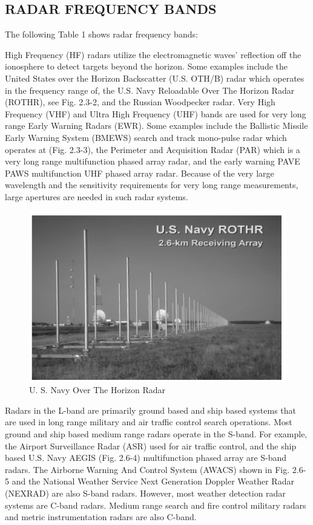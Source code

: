\documentclass[14pt]{article} %
\begin{document}
\subsection{RADAR FREQUENCY BANDS}
The following Table 1 shows radar frequency bands:

 

High Frequency (HF) radars utilize the electromagnetic waves’ reflection off the ionosphere to detect targets beyond the horizon. Some examples include the United States over the Horizon Backscatter (U.S. OTH/B) radar which operates in the frequency range of, the U.S. Navy Reloadable Over The Horizon Radar (ROTHR), see Fig. 2.3-2, and the Russian Woodpecker radar. Very High Frequency (VHF) and Ultra High Frequency (UHF) bands are used for very long range Early Warning Radars (EWR). Some examples include the Ballistic Missile Early Warning System (BMEWS) search and track mono-pulse radar which operates at (Fig. 2.3-3), the Perimeter and Acquisition Radar (PAR) which is a very long range multifunction phased
array radar, and the early warning PAVE PAWS multifunction UHF phased array radar. Because of the very large wavelength and the sensitivity requirements for very long range measurements, large apertures are needed in such radar systems.


 \begin{figure}[H]
  \includegraphics[width=\linewidth]{Horizonradar.png}
  \caption{U. S. Navy Over The Horizon Radar}
  \label{fig:figure 4}
\end{figure}
Radars in the L-band are primarily ground based and ship based systems that are used in long range military and air traffic control search operations. Most ground and ship based medium range radars operate in the S-band. For example, the Airport Surveillance Radar (ASR) used for air traffic control, and the ship based U.S. Navy AEGIS (Fig. 2.6-4) multifunction phased array are S-band radars. The Airborne Warning And Control System (AWACS) shown in Fig. 2.6-5 and the National Weather Service Next Generation Doppler Weather Radar (NEXRAD) are also S-band radars. However, most weather detection radar systems are C-band radars. Medium range search and fire control military radars and metric instrumentation radars are also C-band.
\end{document}

